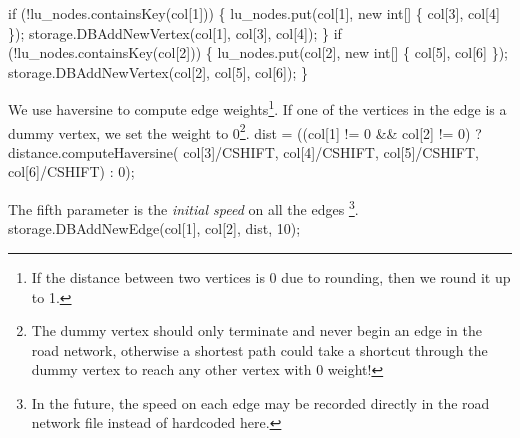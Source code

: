 \documentclass{article}
\def\nwendcode{\endtrivlist \endgroup}      %
\let\nwdocspar=\par
\begin{document}
if (!lu_nodes.containsKey(col[1])) \{
  lu_nodes.put(col[1], new int[] \{ col[3], col[4] \});
  storage.DBAddNewVertex(col[1], col[3], col[4]);
\}
if (!lu_nodes.containsKey(col[2])) \{
  lu_nodes.put(col[2], new int[] \{ col[5], col[6] \});
  storage.DBAddNewVertex(col[2], col[5], col[6]);
\}
\nwendcode{}\nwdocspar
We use haversine to compute edge weights\footnote{If the distance between two
vertices is 0 due to rounding, then we round it up to 1.}.  If one of the
vertices in the edge is a dummy vertex, we set the weight to 0\footnote{The
dummy vertex should only terminate and never begin an edge in the road network,
otherwise a shortest path could take a shortcut through the dummy vertex to
reach any other vertex with 0 weight!}.
\nwenddocs{}\endmoddef{}
dist = ((col[1] != 0 && col[2] != 0)
  ? distance.computeHaversine(
        col[3]/CSHIFT, col[4]/CSHIFT,
        col[5]/CSHIFT, col[6]/CSHIFT) : 0);
\nwendcode{}\nwdocspar
The fifth parameter is the \textit{initial speed} on all the edges \footnote{In
the future, the speed on each edge may be recorded directly in the road network
file instead of hardcoded here.}.
\nwenddocs{}\endmoddef{}
storage.DBAddNewEdge(col[1], col[2], dist, 10);
\nwendcode{}\nwdocspar
\end{document}
